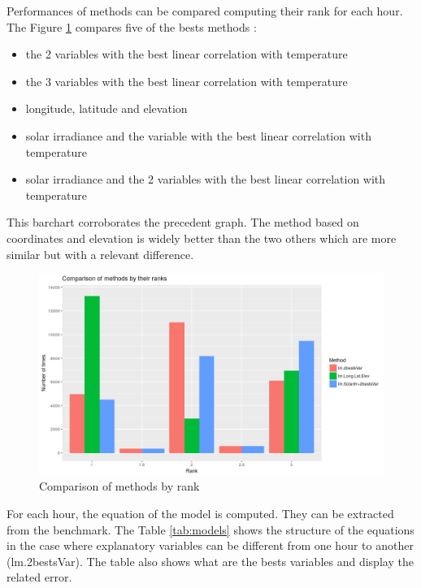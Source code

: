 \documentclass[12pt,twoside]{reedthesis}
\providecommand{\tightlist}{%
  \setlength{\itemsep}{0pt}\setlength{\parskip}{0pt}}
\theoremstyle{definition}
\theoremstyle{definition}
\theoremstyle{definition}
\theoremstyle{remark}
\begin{document}
Performances of methods can be compared computing their rank for each
hour. The Figure \ref{fig:barchart} compares five of the bests methods :
\begin{itemize}
\tightlist
\item
  the 2 variables with the best linear correlation with temperature
\item
  the 3 variables with the best linear correlation with temperature
\item
  longitude, latitude and elevation
\item
  solar irradiance and the variable with the best linear correlation
  with temperature
\item
  solar irradiance and the 2 variables with the best linear correlation
  with temperature
\end{itemize}
This barchart corroborates the precedent graph. The method based on
coordinates and elevation is widely better than the two others which are
more similar but with a relevant difference.
\begin{figure}

{\centering \includegraphics[width=1\linewidth]{figure/barchart} 

}

\caption{Comparison of methods by rank}\label{fig:barchart}
\end{figure}
For each hour, the equation of the model is computed. They can be
extracted from the benchmark. The Table \ref{tab:models} shows the
structure of the equations in the case where explanatory variables can
be different from one hour to another (lm.2bestsVar). The table also
shows what are the bests variables and display the related error.
\end{document}
